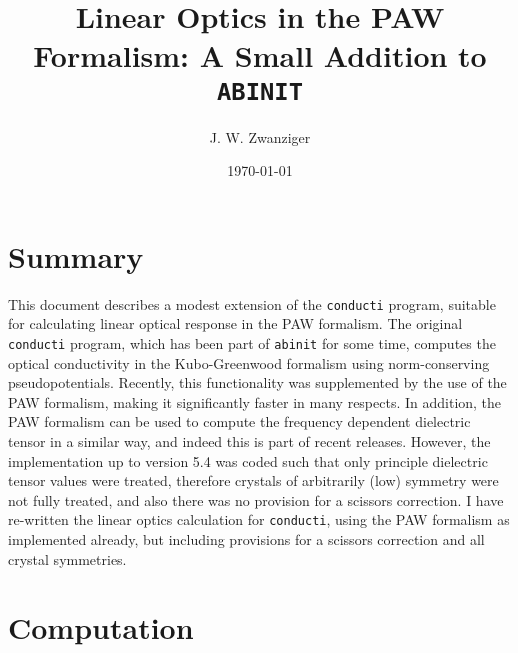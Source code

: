\documentclass[prb,byrevtex]{revtex4}
\begin{document}
\title{Linear Optics in the PAW Formalism: A Small Addition to {\tt ABINIT}}

\author{J. W. Zwanziger}

\date{\today}

\maketitle

\section{Summary}

This document describes a modest extension of the {\tt conducti} program,
suitable for calculating linear optical response in the PAW formalism.
The original {\tt conducti} program, which has been part of {\tt abinit} for
some time, computes the optical conductivity in the Kubo-Greenwood formalism
using norm-conserving pseudopotentials. Recently, this functionality was
supplemented by the use of the PAW formalism, making it significantly
faster in many respects. In addition, the PAW formalism can be used to
compute the frequency dependent dielectric tensor in a similar way, and
indeed this is part of recent releases. However, the implementation up to
version 5.4 was coded such that only principle dielectric tensor values
were treated, therefore crystals of arbitrarily (low) symmetry were not
fully treated, and also there was no provision for a scissors correction. I
have re-written the linear optics calculation for {\tt conducti}, using
the PAW formalism as implemented already, but including provisions for a
scissors correction and all crystal symmetries.

\section{Computation}
\end{document}
